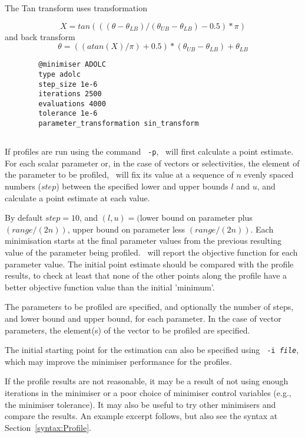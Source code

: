 The Tan transform uses transformation

\begin{equation}
X = tan(((\theta - \theta_{LB}) / (\theta_{UB} - \theta_{LB}) - 0.5) * \pi)
\end{equation}
%
and back transform
\begin{equation}
\theta = ((atan(X) / \pi) + 0.5) * (\theta_{UB} - \theta_{LB}) + \theta_{LB}
\end{equation}

{\small{\begin{verbatim}
		@minimiser ADOLC
		type adolc
		step_size 1e-6
		iterations 2500
		evaluations 4000
		tolerance 1e-6
		parameter_transformation sin_transform
\end{verbatim}}}

\subsection{}\label{sec:Profile}

If profiles are run using the command \texttt{\cname\ -p}, \CNAME\ will first calculate a point estimate. For each scalar parameter or, in the case of vectors or selectivities, the element of the parameter to be profiled, \CNAME\ will fix its value at a sequence of $n$ evenly spaced numbers ($step$) between the specified lower and upper bounds $l$ and $u$, and calculate a point estimate at each value.

By default $step=10$, and $(l, u)=($lower bound on parameter plus $(range/(2n))$, upper bound on parameter less $(range/(2n))$. Each minimisation starts at the final parameter values from the previous resulting value of the parameter being profiled. \CNAME\ will report the objective function for each parameter value. The initial point estimate should be compared with the profile results, to check at least that none of the other points along the profile have a better objective function value than the initial 'minimum'.

The parameters to be profiled are specified, and optionally the number of steps, and lower bound and upper bound, for each parameter. In the case of vector parameters, the element(s) of the vector to be profiled are specified.

The initial starting point for the estimation can also be specified using \texttt{\cname\ -i \emph{file}}, which may improve the minimiser performance for the profiles.

If the profile results are not reasonable, it may be a result of not using enough iterations in the minimiser or a poor choice of minimiser control variables (e.g., the minimiser tolerance). It may also be useful to try other minimisers and compare the results. An example excerpt follows, but also see the syntax at Section~\ref{syntax:Profile}.

